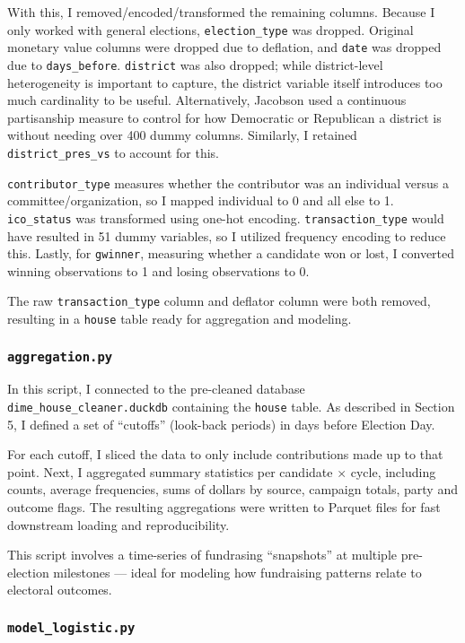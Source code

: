 With this, I removed/encoded/transformed the remaining columns. Because I only worked with general elections, {\tt election\_type} was dropped. Original monetary value columns were dropped due to deflation, and {\tt date} was dropped due to {\tt days\_before}. {\tt district} was also dropped; while district-level heterogeneity is important to capture, the district variable itself introduces too much cardinality to be useful. Alternatively, Jacobson used a continuous partisanship measure to control for how Democratic or Republican a district is without needing over 400 dummy columns. Similarly, I retained {\tt district\_pres\_vs} to account for this.  

{\tt contributor\_type} measures whether the contributor was an individual versus a committee/organization, so I mapped individual to 0 and all else to 1. {\tt ico\_status} was transformed using one-hot encoding. {\tt transaction\_type} would have resulted in 51 dummy variables, so I utilized frequency encoding to reduce this. Lastly, for {\tt gwinner}, measuring whether a candidate won or lost, I converted winning observations to 1 and losing observations to 0.

The raw {\tt transaction\_type} column and deflator column were both removed, resulting in a {\tt house} table ready for aggregation and modeling.

\subsubsection*{\tt aggregation.py}

In this script, I connected to the pre-cleaned database {\tt dime\_house\_cleaner.duckdb} containing the {\tt house} table. As described in Section 5, I defined a set of ``cutoffs'' (look-back periods) in days before Election Day.

For each cutoff, I sliced the data to only include contributions made up to that point. Next, I aggregated summary statistics per candidate $\times$ cycle, including counts, average frequencies, sums of dollars by source, campaign totals, party and outcome flags. The resulting aggregations were written to Parquet files for fast downstream loading and reproducibility.

This script involves a time-series of fundrasing ``snapshots'' at multiple pre-election milestones --- ideal for modeling how fundraising patterns relate to electoral outcomes. 

\subsubsection*{\tt model\_logistic.py}

